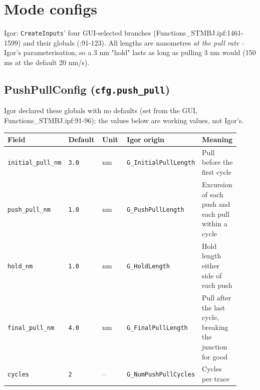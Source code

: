 \section{Mode configs}

Igor: \texttt{Create\discretionary{}{}{}Inputs}' four GUI-selected branches (Functions\_STMBJ.ipf:1461-1599) and their globals (:91-123). All lengths are nanometres \emph{at the pull rate} -- Igor's parameterisation, so a 3 nm "hold" lasts as long as pulling 3 nm would (150 ms at the default 20 nm/s).

\subsection{PushPullConfig (\texttt{cfg.\discretionary{}{}{}push\_\discretionary{}{}{}pull})}

Igor declared these globals with no defaults (set from the GUI, Functions\_STMBJ.ipf:91-96); the values below are working values, not Igor's.

\footnotesize\setlength{\LTleft}{0pt}\setlength{\LTright}{\fill}
\begin{longtable}{@{}>{\raggedright\arraybackslash}p{0.184\linewidth}>{\raggedright\arraybackslash}p{0.184\linewidth}>{\raggedright\arraybackslash}p{0.184\linewidth}>{\raggedright\arraybackslash}p{0.184\linewidth}>{\raggedright\arraybackslash}p{0.184\linewidth}@{}}
\toprule
\textbf{Field} & \textbf{Default} & \textbf{Unit} & \textbf{Igor origin} & \textbf{Meaning} \\
\midrule\endhead
\texttt{initial\_\discretionary{}{}{}pull\_\discretionary{}{}{}nm} & \texttt{3.\discretionary{}{}{}0} & nm & \texttt{G\_\discretionary{}{}{}Initial\discretionary{}{}{}Pull\discretionary{}{}{}Length} & Pull before the first cycle \\
\texttt{push\_\discretionary{}{}{}pull\_\discretionary{}{}{}nm} & \texttt{1.\discretionary{}{}{}0} & nm & \texttt{G\_\discretionary{}{}{}Push\discretionary{}{}{}Pull\discretionary{}{}{}Length} & Excursion of each push and each pull within a cycle \\
\texttt{hold\_\discretionary{}{}{}nm} & \texttt{1.\discretionary{}{}{}0} & nm & \texttt{G\_\discretionary{}{}{}Hold\discretionary{}{}{}Length} & Hold length either side of each push \\
\texttt{final\_\discretionary{}{}{}pull\_\discretionary{}{}{}nm} & \texttt{4.\discretionary{}{}{}0} & nm & \texttt{G\_\discretionary{}{}{}Final\discretionary{}{}{}Pull\discretionary{}{}{}Length} & Pull after the last cycle, breaking the junction for good \\
\texttt{cycles} & \texttt{2} & -- & \texttt{G\_\discretionary{}{}{}Num\discretionary{}{}{}Push\discretionary{}{}{}Pull\discretionary{}{}{}Cycles} & Cycles per trace \\
\bottomrule
\end{longtable}
\normalsize

